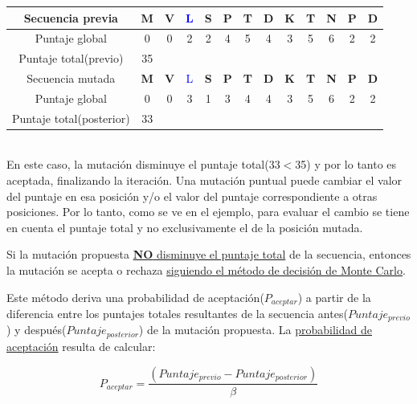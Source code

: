 \begin{enumerate}
\vspace{0.3cm}
       \begin{tabular}{ccccccccccccc}
       \hline
       
	Secuencia previa &  \textbf{M} & \textbf{V} & \textcolor{blue}{L} & \textbf{S} & \textbf{P} & \textbf{T} & \textbf{D} & \textbf{K} & \textbf{T} & \textbf{N} & \textbf{P} & \textbf{D}\\  \hline
	Puntaje global & 0 & 0 & 2 & 2 & 4 & 5 & 4 & 3 & 5 & 6 & 2 & 2\\  \hline
       Puntaje total(previo) & 35 \\ \hline \hline
       Secuencia mutada & \textbf{M} & \textbf{V} & \textcolor{blue}{L} & \textbf{S} & \textbf{P} & \textbf{T} & \textbf{D} & \textbf{K} & \textbf{T} & \textbf{N} & \textbf{P} & \textbf{D}\\  \hline
	Puntaje global  & 0 & 0 & 3 & 1 & 3 & 4 & 4 & 3 & 5 & 6 & 2 & 2\\  \hline
       Puntaje total(posterior) & 33 \\  \hline
      \end{tabular}\\
      
    En este caso, la mutación disminuye el puntaje total(33$<$35) y por lo tanto es aceptada, finalizando la iteración.
    Una mutación puntual puede cambiar el valor del puntaje en esa posición y/o el valor del puntaje correspondiente a otras posiciones. 
    Por lo tanto, como se ve en el ejemplo, para evaluar el cambio se tiene en cuenta el puntaje total y no exclusivamente el de la posición mutada. 
    
    
    Si la mutación propuesta \underline{\textbf{NO} disminuye el puntaje total} de la secuencia, entonces la mutación se acepta o rechaza \underline{siguiendo el método de decisión de Monte Carlo}. 
    
    Este método deriva una probabilidad de aceptación($P_{aceptar}$) a partir de la diferencia entre los puntajes totales resultantes de la secuencia antes($Puntaje_{previo}$) y después($Puntaje_{posterior}$) de la mutación propuesta.
    La \underline{probabilidad de aceptación} resulta de calcular:
    
    \begin{equation}\label{monteCarlo}
    P_{aceptar} =  \frac{(Puntaje_{previo}  - Puntaje_{posterior}) } {\beta} 
    \end{equation}


\end{enumerate}
